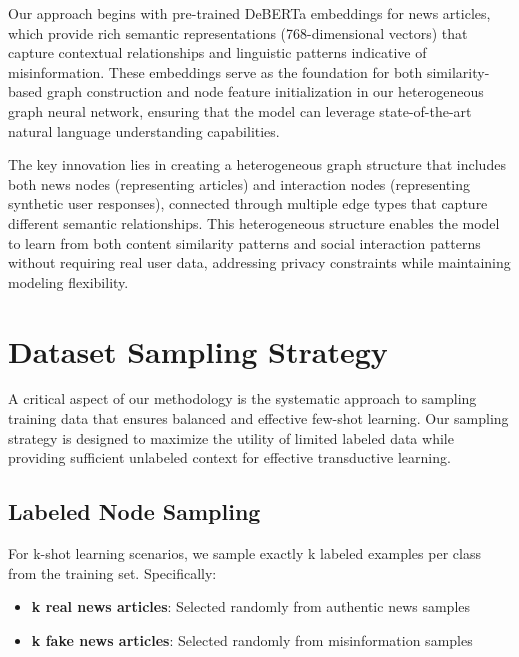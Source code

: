 
Our approach begins with pre-trained DeBERTa embeddings for news articles, which provide rich semantic representations (768-dimensional vectors) that capture contextual relationships and linguistic patterns indicative of misinformation. These embeddings serve as the foundation for both similarity-based graph construction and node feature initialization in our heterogeneous graph neural network, ensuring that the model can leverage state-of-the-art natural language understanding capabilities.

The key innovation lies in creating a heterogeneous graph structure that includes both news nodes (representing articles) and interaction nodes (representing synthetic user responses), connected through multiple edge types that capture different semantic relationships. This heterogeneous structure enables the model to learn from both content similarity patterns and social interaction patterns without requiring real user data, addressing privacy constraints while maintaining modeling flexibility.

\section{Dataset Sampling Strategy}

A critical aspect of our methodology is the systematic approach to sampling training data that ensures balanced and effective few-shot learning. Our sampling strategy is designed to maximize the utility of limited labeled data while providing sufficient unlabeled context for effective transductive learning.

\subsection{Labeled Node Sampling}

For k-shot learning scenarios, we sample exactly k labeled examples per class from the training set. Specifically:
\begin{itemize}
    \item \textbf{k real news articles}: Selected randomly from authentic news samples
    \item \textbf{k fake news articles}: Selected randomly from misinformation samples  
\end{itemize}

